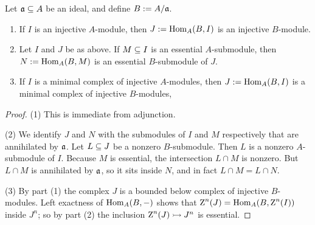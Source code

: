 \begin{lem} \label{lem:2231}
Let $\mathfrak{a} \subseteq A$ be an ideal, and define $B := A / \mathfrak{a}$. 
\begin{enumerate}
\item If $I$ is an injective $A$-module, then 
$J := \operatorname{Hom}_A(B, I)$ is an injective $B$-module. 

\item Let $I$ and $J$ be as above. If $M \subseteq I$ is an essential $A$-submodule, 
then $N := \operatorname{Hom}_A(B, M)$ is an essential $B$-submodule of $J$.

\item If $I$ is a minimal complex of injective $A$-modules, then 
$J := \operatorname{Hom}_A(B, I)$ is a minimal complex of injective $B$-modules,
\end{enumerate}
\end{lem}

\begin{proof}
(1) This is immediate from adjunction. 

\medskip \noindent
(2) We identify $J$ and $N$ with the submodules of $I$ and $M$ respectively 
that are annihilated by $\mathfrak{a}$. Let $L \subseteq J$ be a nonzero $B$-submodule.
Then $L$ is a nonzero $A$-submodule of $I$. 
Because $M$ is essential, the intersection $L \cap M$ is nonzero.
But $L \cap M$ is annihilated by $\mathfrak{a}$, so it sits inside $N$, and in fact 
$L \cap M = L \cap N$. 

\medskip \noindent
(3) By part (1) the complex $J$ is a bounded below complex of injective 
$B$-modules. Left exactness of $\operatorname{Hom}_A(B, -)$ shows that 
$\operatorname{Z}^n(J) = \operatorname{Hom}_A(B, \operatorname{Z}^n(I))$ inside $J^n$; so by part (2) 
the inclusion $\operatorname{Z}^n(J) \rightarrowtail J^n$ is essential.
\end{proof}

